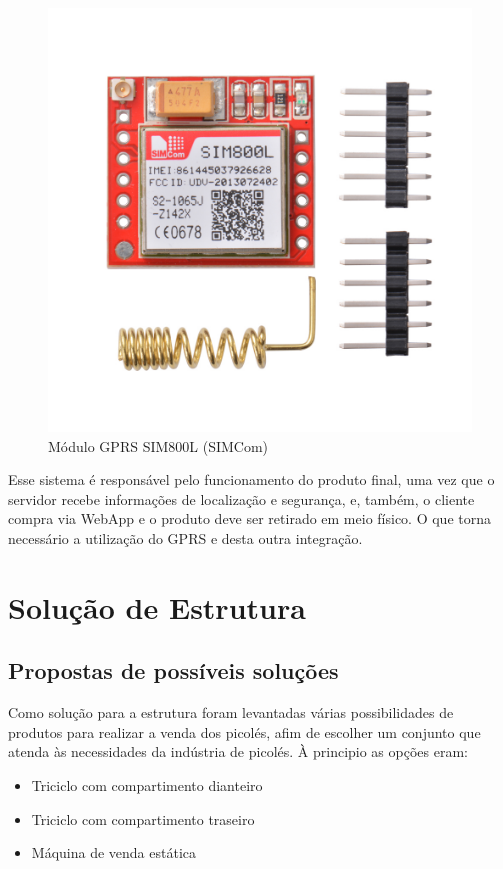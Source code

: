 \begin{figure}[H]
	\centering
    \includegraphics[scale=0.20]{figuras/modulo_gprs}
    \caption{Módulo GPRS SIM800L (SIMCom)}
    \label{fig:modulo_gprs}
\end{figure}

Esse sistema é responsável pelo funcionamento do produto final, uma vez que o servidor recebe informações de localização e segurança, e, também, o cliente compra via WebApp e o produto deve ser retirado em meio físico. O que torna necessário a utilização do GPRS e desta outra integração.

\section{Solução de Estrutura}

\subsection{Propostas de possíveis soluções}
Como solução para a estrutura foram levantadas várias possibilidades de produtos para realizar a venda dos picolés, afim de escolher um conjunto que atenda às necessidades da indústria de picolés. À principio as opções eram:

\begin{itemize}
\item Triciclo com compartimento dianteiro
\item Triciclo com compartimento traseiro
\item Máquina de venda estática
\end{itemize}

